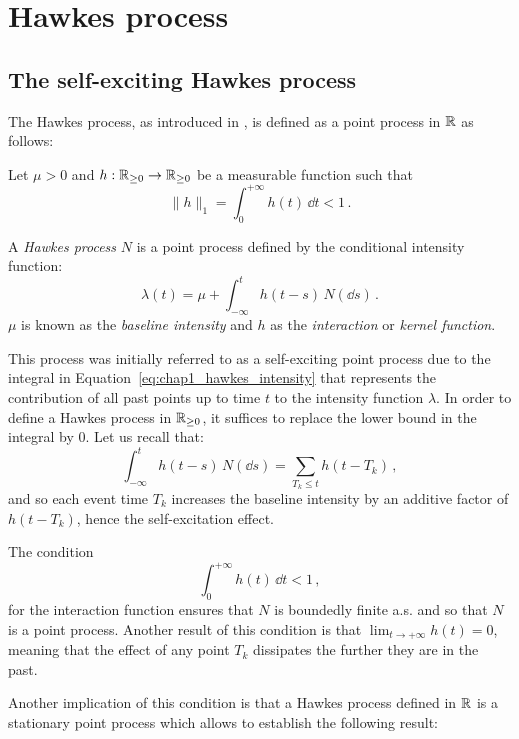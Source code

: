 \section{Hawkes process}\label{sec:chap1_hawkes_process}

\subsection{The self-exciting Hawkes process}

The Hawkes process, as introduced in \textcite{Hawkes1971}, is defined as a point process in ${\mathbb R}$ as follows:

\begin{definition}\label{def:chap1_hawkes_process}
    Let $\mu>0$ and $h:{\mathbb R}_{\geq 0}\to{\mathbb R}_{\geq 0}$ be a measurable function such that \[\|h\|_1 = \int_{0}^{+\infty}{h(t)\,\dd t} < 1\,.\]

    A \emph{Hawkes process} $N$ is a point process defined by the conditional intensity function:
    \begin{equation}\label{eq:chap1_hawkes_intensity}
        \lambda(t) = \mu + \int_{-\infty}^{t}{h(t-s)\,N(\dd s)}\,.
    \end{equation}
    $\mu$ is known as the \emph{baseline intensity} and $h$ as the \emph{interaction} or \emph{kernel function}.
\end{definition}
This process was initially referred to as a self-exciting point process due to the integral in Equation~\eqref{eq:chap1_hawkes_intensity} that represents the contribution of all past points up to time $t$ to the intensity function $\lambda$. In order to define a Hawkes process in ${\mathbb R}_{\geq 0}$, it suffices to replace the lower bound in the integral by $0$.
Let us recall that:
\[\int_{-\infty}^{t}{h(t-s)\,N(\dd s)} = \sum_{T_k \leq t}{h(t - T_k)}\,,\]
and so each event time $T_k$ increases the baseline intensity by an additive factor of $h(t - T_k)$, hence the self-excitation effect.

The condition \[\int_{0}^{+\infty}{h(t)\,\dd t} < 1\,,\] for the interaction function ensures that $N$ is boundedly finite a.s. and so that $N$ is a point process.
Another result of this condition is that $\lim_{t\to+\infty}h(t) = 0$, meaning that the effect of any point $T_k$ dissipates the further they are in the past.

Another implication of this condition is that a Hawkes process defined in ${\mathbb R}$ is a stationary point process which allows to establish the following result:

